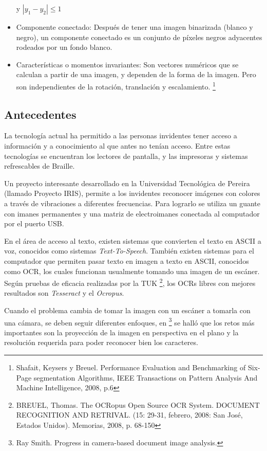 \documentclass[a4paper, 11pt, oneside]{article}
\begin{document}
\begin{itemize}
    y $|y_1-y_2| \le 1$
    \item Componente conectado: Después de tener una imagen binarizada (blanco y negro), un
    componente conectado es un conjunto de píxeles negros adyacentes rodeados por un fondo blanco.
    \item Características o momentos invariantes: Son vectores numéricos que se calculan a partir
    de una imagen, y dependen de la forma de la imagen. Pero son independientes de la rotación,
    translación y escalamiento.
    \footnote{Shafait, Keysers y Breuel. Performance Evaluation and Benchmarking of Six-Page segmentation
    Algorithms, IEEE Transactions on Pattern Analysis And Machine Intelligence, 2008, p.6}
   
	\end{itemize}
	
	\subsection {Antecedentes}
	La tecnología actual ha permitido a las personas invidentes tener acceso a información
	y a conocimiento al que antes no tenían acceso. Entre estas tecnologías se encuentran los
	lectores de pantalla, y las impresoras y sistemas refrescables de Braille.
	
	Un proyecto interesante desarrollado en la Universidad Tecnológica de Pereira (llamado 
    Proyecto IRIS), permite a los invidentes reconocer imágenes con colores a través de 
    vibraciones a diferentes frecuencias. Para lograrlo se utiliza un guante con imanes 
	permanentes y una matriz de electroimanes conectada al computador por el puerto USB.

	En el área de acceso al texto, existen sistemas que convierten el texto en ASCII a voz,
	conocidos como sistemas \textit{Text-To-Speech}. También existen sistemas para el computador
	que permiten pasar texto en imagen a texto en ASCII, conocidos como OCR, los cuales funcionan
	usualmente tomando una imagen de un escáner. Según pruebas de eficacia realizadas por la TUK
    \footnote{BREUEL, Thomas. The OCRopus Open Source OCR System. DOCUMENT RECOGNITION AND RETRIVAL. 
    (15: 29-31, febrero, 2008: San José, Estados Unidos). Memorias, 2008, p. 68-150},
    los OCRs libres con mejores resultados son \textit{Tesseract} y el  \textit{Ocropus}. 

    Cuando el problema cambia de tomar la imagen con un escáner a tomarla con una cámara, 
    se deben seguir diferentes enfoques, en \footnote{Ray Smith. Progress in camera-based 
    document image analysis.} se halló que los retos más importantes son la proyección de 
    la imagen en perspectiva en el plano y la  resolución requerida para poder reconocer 
    bien los caracteres.
\end{document}
